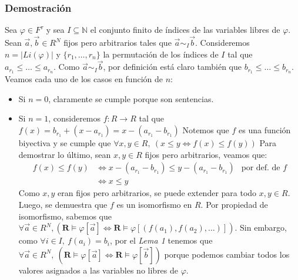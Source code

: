 \documentclass{article}
\begin{document}
\subsubsection*{Demostración}
Sea $\varphi\in F^\tau$ y sea $I\subseteq\mathbb{N}$ el conjunto finito de índices de las variables libres de $\varphi$.
Sean $\vec{a},\vec{b}\in R^N$ fijos pero arbitrarios tales que $\vec{a}\sim_I\vec{b}$.
\newline
Consideremos $n=|Li(\varphi)|$ y $\{r_1,\dots,r_n\}$ la permutación de los índices de $I$ tal que $a_{r_1}\leq\dots\leq a_{r_n}$. Como $\vec{a}\sim_I\vec{b}$, por definición está claro también que $b_{r_1}\leq\dots\leq b_{r_n}$.
\newline
Veamos cada uno de los casos en función de $n$:
\begin{itemize}
  \item Si $n=0$, claramente se cumple porque son sentencias.
  \item Si $n=1$, consideremos $f:R\to R$ tal que $f(x)=b_{r_1}+(x-a_{r_1})=x-(a_{r_1}-b_{r_1})$ \newline
        \hspace*{0.5cm} Notemos que $f$ es una función biyectiva y se cumple que $\forall x,y\in R,\ (x\leq y\iff f(x)\leq f(y))$ \newline
        \hspace*{0.5cm} Para demostrar lo último, sean $x,y\in R$ fijos pero arbitrarios, veamos que:
        \begin{equation*}
          \begin{aligned}
            f(x)\leq f(y) & \iff x-(a_{r_1}-b_{r_1})\leq y-(a_{r_1}-b_{r_1}) & \text{por def. de }f \\
                          & \iff x\leq y
          \end{aligned}
        \end{equation*}
        \hspace*{0.5cm} Como $x,y$ eran fijos pero arbitrarios, se puede extender para todo $x,y\in R$. Luego, se demuestra que $f$ es un isomorfismo en $R$. \newline
        \hspace*{0.5cm} Por propiedad de isomorfismo, sabemos que $\forall\vec{a}\in R^N, (\mathbf{R}\vDash\varphi[\vec{a}]\iff\mathbf{R}\vDash\varphi[(f(a_1),f(a_2),\dots)])$. \newline
        \hspace*{0.5cm} Sin embargo, como $\forall i\in I,\ f(a_i)=b_i$, por el \textit{Lema 1} tenemos que $\forall\vec{a}\in R^N,\ (\mathbf{R}\vDash\varphi[\vec{a}]\iff\mathbf{R}\vDash\varphi[\vec{b}])$ porque podemos cambiar todos los valores asignados a las variables no libres de $\varphi$. \newline

\end{itemize}
\end{document}
